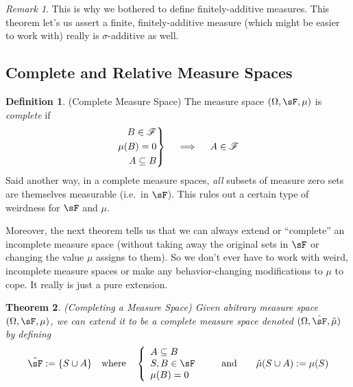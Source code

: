 \documentclass[12pt]{article}
\theoremstyle{plain}
\newtheorem{thm}{Theorem}[section]
\theoremstyle{definition}
\newtheorem{defn}[thm]{Definition}
\theoremstyle{remark}
\newtheorem*{rmk}{Remark}
\newenvironment{rcases}
  {\left.\begin{aligned}}
  {\end{aligned}\right\rbrace}
\begin{document}
\begin{rmk}
This is why we bothered to define finitely-additive measures.
This theorem let's us assert a finite, finitely-additive measure (which
might be easier to work with) really is $\sigma$-additive as well.
\end{rmk}

\clearpage
\subsection{Complete and Relative Measure Spaces}

\begin{defn}(Complete Measure Space)
The measure space $(\Omega,\sF,\mu)$ is \emph{complete} if
\begin{align*}
  \begin{rcases}
      B\in\mathscr{F} \\
      \mu(B) = 0\\
      A\subseteq B
  \end{rcases}
  \quad \implies\quad
  A\in\mathscr{F}
\end{align*}
Said another way, in a complete measure spaces, \emph{all} subsets of
measure zero sets are themselves measurable (i.e.\ in $\sF$). This rules
out a certain type of weirdness for $\sF$ and $\mu$.

Moreover, the next theorem tells us that we can always extend or
``complete'' an incomplete measure space (without taking away the
original sets in $\sF$ or changing the value $\mu$ assigns to them). So
we don't ever have to work with weird, incomplete measure spaces or make
any behavior-changing modifications to $\mu$ to cope. It really is just
a pure extension.
\end{defn}

\begin{thm}\emph{(Completing a Measure Space)}
Given abitrary measure space $(\Omega,\sF,\mu)$, we can extend it to be
a \emph{complete} measure space denoted
$(\Omega,\hat{\sF},\hat{\mu})$ by defining
\begin{align*}
  \hat{\sF} := \{S\cup A \}
  \quad \text{where} \quad
  \left\{
      \begin{array}{l}
      A \subseteq B\\
      S, B\in\sF\\
      \mu(B) = 0 \\
  \end{array}
  \right.
  \qquad \text{and} \qquad
  \hat{\mu}(S\cup A) := \mu(S)
\end{align*}
\end{thm}
\end{document}

